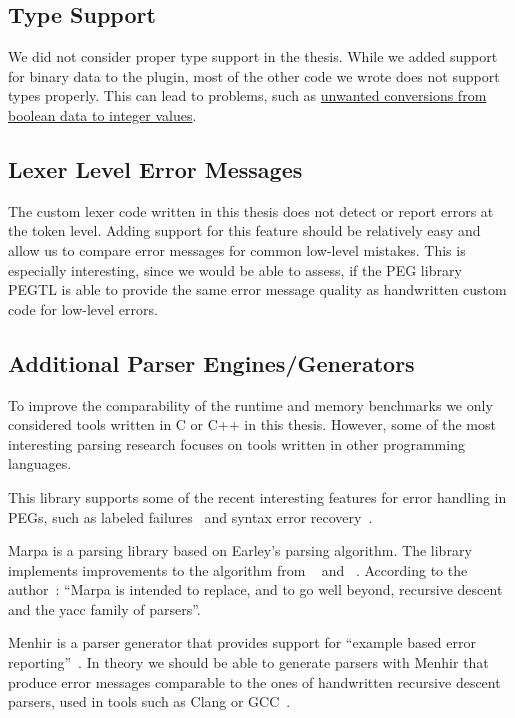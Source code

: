 \subsection{Type Support}

We did not consider proper type support in the thesis. While we added support for binary data to the \LinkYAMLCPP{} plugin, most of the other code we wrote does not support types properly. This can lead to problems, such as \href{https://issues.libelektra.org/2833}{unwanted conversions from boolean data to integer values}.

\subsection{Lexer Level Error Messages}

The custom lexer code written in this thesis does not detect or report errors at the \gls{token} level. Adding support for this feature should be relatively easy and allow us to compare error messages for common low-level mistakes. This is especially interesting, since we would be able to assess, if the PEG library \gls{PEGTL} is able to provide the same error message quality as handwritten custom code for low-level errors.

\subsection{Additional Parser Engines/Generators}

To improve the comparability of the runtime and memory benchmarks we only considered tools written in C or C++ in this thesis. However, some of the most interesting parsing research focuses on tools written in other programming languages.

\begin{description}[style=multiline, leftmargin=3cm, font=\bfseries]
  \item[LPegLabel (Lua)] This library supports some of the recent interesting features for error handling in \glspl{PEG}, such as labeled failures~\cite{maidl2016labeled} and syntax error recovery~\cite{medeiros2018recovery}.

  \item[Marpa (Perl)] Marpa is a parsing library based on Earley’s parsing algorithm. The library implements improvements to the algorithm from \citeauthor{leo1991general}~\cite{leo1991general} and \citeauthor{aycock2002practical}~\cite{aycock2002practical}. According to the author~\cite{kegler2019marpa}: “Marpa is intended to replace, and to go well beyond, recursive descent and the yacc family of parsers”.

  \item [Menhir (OCaml)] Menhir is a  parser generator that provides support for “example based error reporting”~\cite{jeffery2003generating, kaestner2018compcert, pottier2019menhir}. In theory we should be able to generate parsers with Menhir that produce error messages comparable to the ones of handwritten recursive descent parsers, used in tools such as Clang or GCC~\cite[p. 2]{kaestner2018compcert}.
\end{description}
